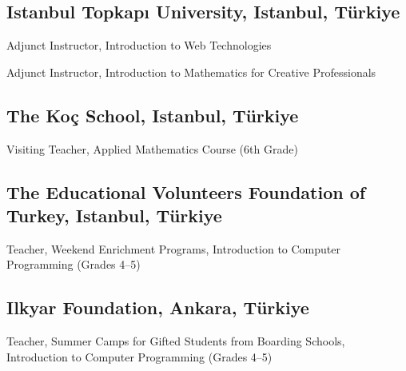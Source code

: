 \documentclass[11pt,letterpaper]{report} %
\begin{document}
    \subsection*{Istanbul Topkapı University, Istanbul, Türkiye}

    \begin{tablist}

        \item[2013] \tab{}Adjunct Instructor, Introduction to Web Technologies

        \item[2011--13] \tab{}Adjunct Instructor, Introduction to Mathematics for Creative Professionals

    \end{tablist}


    \subsection*{The Koç School, Istanbul, Türkiye}

    \begin{tablist}

        \item[2013] \tab{}Visiting Teacher, Applied Mathematics Course (6th Grade)

    \end{tablist}


    \subsection*{The Educational Volunteers Foundation of Turkey, Istanbul, Türkiye}

    \begin{tablist}

        \item[2010--12] \tab{}Teacher, Weekend Enrichment Programs, Introduction to Computer Programming (Grades 4--5)

    \end{tablist}


    \subsection*{Ilkyar Foundation, Ankara, Türkiye}

    \begin{tablist}

        \item[2008--10] \tab{}Teacher, Summer Camps for Gifted Students from Boarding Schools, Introduction to Computer Programming (Grades 4--5)

    \end{tablist}
\end{document}
